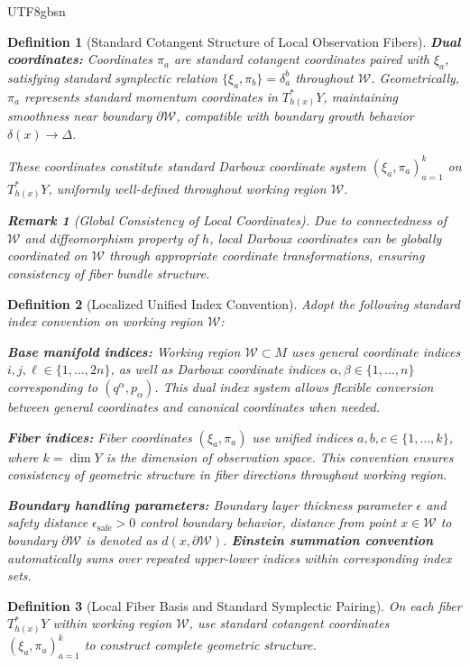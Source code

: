 \documentclass[a4paper,12pt]{extarticle}
\newtheorem{definition}{Definition}
\theoremstyle{definition}
\newtheorem{remark}{Remark}
\begin{document}
\begin{CJK}{UTF8}{gbsn}
\begin{definition}[Standard Cotangent Structure of Local Observation Fibers]
\textbf{Dual coordinates:}
Coordinates $\pi_a$ are standard cotangent coordinates paired with $\xi_a$, satisfying standard symplectic relation $\{\xi_a, \pi_b\} = \delta_a^b$ throughout $\mathcal{W}$. Geometrically, $\pi_a$ represents standard momentum coordinates in $T^*_{h(x)}Y$, maintaining smoothness near boundary $\partial \mathcal{W}$, compatible with boundary growth behavior $\delta(x) \to \Delta$.

These coordinates constitute standard Darboux coordinate system $(\xi_a, \pi_a)_{a=1}^k$ on $T^*_{h(x)}Y$, uniformly well-defined throughout working region $\mathcal{W}$.

\begin{remark}[Global Consistency of Local Coordinates]
Due to connectedness of $\mathcal{W}$ and diffeomorphism property of $h$, local Darboux coordinates can be globally coordinated on $\mathcal{W}$ through appropriate coordinate transformations, ensuring consistency of fiber bundle structure.
\end{remark}
\end{definition}


\begin{definition}[Localized Unified Index Convention]
Adopt the following standard index convention on working region $\mathcal{W}$:

\textbf{Base manifold indices:}
Working region $\mathcal{W} \subset M$ uses general coordinate indices $i,j,\ell \in \{1,\ldots,2n\}$, as well as Darboux coordinate indices $\alpha,\beta \in \{1,\ldots,n\}$ corresponding to $(q^\alpha, p_\alpha)$. This dual index system allows flexible conversion between general coordinates and canonical coordinates when needed.

\textbf{Fiber indices:}
Fiber coordinates $(\xi_a, \pi_a)$ use unified indices $a,b,c \in \{1,\ldots,k\}$, where $k = \dim Y$ is the dimension of observation space. This convention ensures consistency of geometric structure in fiber directions throughout working region.

\textbf{Boundary handling parameters:}
Boundary layer thickness parameter $\epsilon$ and safety distance $\epsilon_{\text{safe}} > 0$ control boundary behavior, distance from point $x \in \mathcal{W}$ to boundary $\partial \mathcal{W}$ is denoted as $d(x,\partial \mathcal{W})$. \textbf{Einstein summation convention} automatically sums over repeated upper-lower indices within corresponding index sets.
\end{definition}

\begin{definition}[Local Fiber Basis and Standard Symplectic Pairing]
On each fiber $T^*_{h(x)}Y$ within working region $\mathcal{W}$, use standard cotangent coordinates $(\xi_a, \pi_a)_{a=1}^k$ to construct complete geometric structure.


\end{definition}
\end{CJK}
\end{document}

